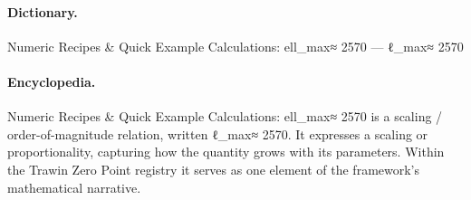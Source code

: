 \paragraph{Dictionary.}
Numeric Recipes \& Quick Example Calculations: ell\_max≈ 2570 — ℓ\_max≈ 2570

\paragraph{Encyclopedia.}
Numeric Recipes \& Quick Example Calculations: ell\_max≈ 2570 is a scaling / order-of-magnitude relation, written ℓ\_max≈ 2570. It expresses a scaling or proportionality, capturing how the quantity grows with its parameters. Within the Trawin Zero Point registry it serves as one element of the framework's mathematical narrative.

